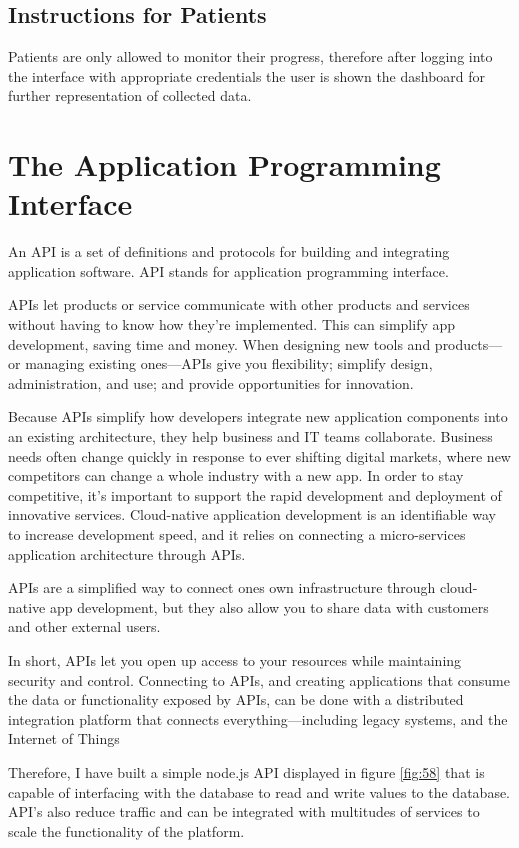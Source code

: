 \documentclass[12pt]{article}
\begin{document}
\subsection{Instructions for Patients}
Patients are only allowed to monitor their progress, therefore after logging into the interface with appropriate credentials the user is shown the dashboard for further representation of collected data.

\newpage
\section{The Application Programming Interface}
An API is a set of definitions and protocols for building and integrating application software. API stands for application programming interface.

APIs let products or service communicate with other products and services without having to know how they’re implemented. This can simplify app development, saving time and money. When designing new tools and products—or managing existing ones—APIs give you flexibility; simplify design, administration, and use; and provide opportunities for innovation.

Because APIs simplify how developers integrate new application components into an existing architecture, they help business and IT teams collaborate. Business needs often change quickly in response to ever shifting digital markets, where new competitors can change a whole industry with a new app. In order to stay competitive, it's important to support the rapid development and deployment of innovative services. Cloud-native application development is an identifiable way to increase development speed, and it relies on connecting a micro-services application architecture through APIs.

APIs are a simplified way to connect ones own infrastructure through cloud-native app development, but they also allow you to share data with customers and other external users. 

In short, APIs let you open up access to your resources while maintaining security and control. Connecting to APIs, and creating applications that consume the data or functionality exposed by APIs, can be done with a distributed integration platform that connects everything—including legacy systems, and the Internet of Things\cite{redhat}

Therefore, I have built a simple node.js API displayed in figure \ref{fig:58} that is capable of interfacing with the database to read and write values to the database. API's also reduce traffic and can be integrated with multitudes of services to scale the functionality of the platform.
\end{document}
